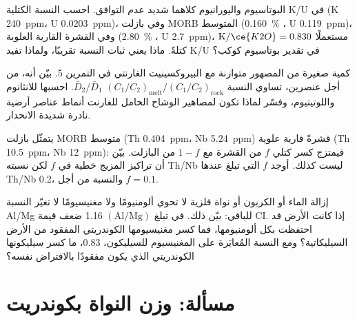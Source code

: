 \begin{exercise}[$\star\star$]\label{exo:b2:elements-in-the-earth:9}
البوتاسيوم واليورانيوم كلاهما شديد عدم التوافق. احسب النسبة الكتلية K/U في
 (K \qty{240}{ppm}، U \qty{0.0203}{ppm})، وفي بازلت MORB المتوسط
(\qty{0.160}{\percent} ، U \qty{0.119}{ppm})، وفي القشرة القارية
العلوية (\qty{2.80}{\percent} ، U \qty{2.7}{ppm})، مستعملًا
$\mathrm{K}/\ce{K2O} = 0.830$ كتلةً. ماذا يعني ثبات النسبة تقريبًا،
ولماذا تفيد K/U في تقدير بوتاسيوم كوكب؟
\end{exercise}

\begin{exercise}[$\star\star\star$]\label{exo:b2:elements-in-the-earth:10}
كمية صغيرة من المصهور متوازنة مع البيروكسينيت الغارنتي في التمرين
5. بيّن أنه، من أجل عنصرين، تساوي النسبة
$(C_1/C_2)_{\mathrm{melt}}/(C_1/C_2)_{\mathrm{rock}}$
$\bar D_2/\bar D_1$. احسبها للانثانوم واللوتيتيوم، وفسّر لماذا تكون
لمصاهير الوشاح الحامل للغارنت أنماط عناصر أرضية نادرة شديدة الانحدار.
\end{exercise}

\begin{exercise}[$\star\star\star$]\label{exo:b2:elements-in-the-earth:11}
يتمثّل بازلت MORB متوسط (Th \qty{0.404}{ppm}، Nb \qty{5.24}{ppm}) قشرةً قارية
علوية (Th \qty{10.5}{ppm}، Nb \qty{12}{ppm}): فيمتزج كسر كتلي $f$ من
القشرة مع $1-f$ من البازلت. بيّن أن تراكيز المزيج
خطية في $f$ لكن نسبته Th/Nb ليست كذلك. أوجد $f$ التي تبلغ عندها Th/Nb
0.2، والنسبة من أجل $f = 0.1$.
\end{exercise}

\begin{exercise}[$\star\star\star$]\label{exo:b2:elements-in-the-earth:12}
إزالة الماء أو الكربون أو نواة فلزية لا تحوي ألومنيومًا ولا
مغنيسيومًا لا تغيّر النسبة Al/Mg للباقي: بيّن ذلك. في  تبلغ $(\mathrm{Al}/\mathrm{Mg})$ 1.16 ضعف قيمة CI. إذا كانت
الأرض قد احتفظت بكل ألومنيومها، فما كسر مغنيسيومها الكوندريتي
المفقود من الأرض السيليكاتية؟ ومع النسبة المُعايَرة على المغنيسيوم للسيليكون،
0.83، ما كسر سيليكونها الكوندريتي الذي يكون مفقودًا بالافتراض
نفسه؟
\end{exercise}

\section{مسألة: وزن النواة بكوندريت}

